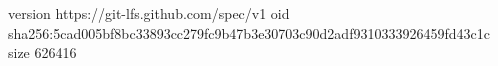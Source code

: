 version https://git-lfs.github.com/spec/v1
oid sha256:5cad005bf8bc33893cc279fc9b47b3e30703c90d2adf9310333926459fd43c1c
size 626416
